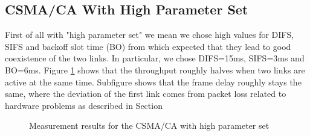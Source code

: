 \clearpage

\subsection{CSMA/CA With High Parameter Set}

First of all with "high parameter set" we mean we chose high values for DIFS, SIFS and backoff slot time (BO) from which expected that they lead to good coexistence of the two links. In particular, we chose DIFS=15ms, SIFS=3ms and BO=6ms. Figure \ref{fig:results-csma-high-dbl-1}  shows that the throughput roughly halves when two links are active at the same time. Subfigure  shows that the frame delay roughly stays the same, where the deviation of the first link comes from packet loss related to hardware problems as described in Section 

\begin{figure}[tb]
	\label{fig:results-csma-high-dbl-1}
	\begin{center}
		\centerline{
		}	
	\end{center}
	\caption{Measurement results for the CSMA/CA with high parameter set}
\end{figure}

